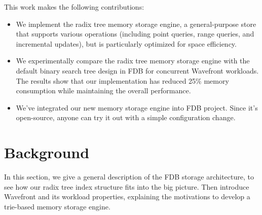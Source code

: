\documentclass[sigplan,screen,nonacm]{acmart}
\begin{document}
This work makes the following contributions:
\begin{itemize}
\item We implement the radix tree memory storage engine, a general-purpose store that supports various operations (including point queries, range queries, and incremental updates), but is particularly optimized for space efficiency. 
\item We experimentally compare the radix tree memory storage engine with the default binary search tree design in FDB for concurrent Wavefront workloads. The results show that our implementation has reduced 25\% memory consumption while maintaining the overall performance. 
\item We’ve integrated our new memory storage engine into FDB project. Since it’s open-source, anyone can try it out with a simple configuration change.  
\end{itemize}

\section{Background}
In this section, we give a general description of the FDB storage architecture, to see how our radix tree index structure fits into the big picture. Then introduce Wavefront and its workload properties, explaining the motivations to develop a trie-based memory storage engine. 
\end{document}
